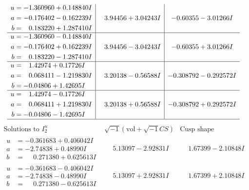 \documentclass[1p]{elsarticle_modified}
\theoremstyle{definition}
\newcommand{\I}{\sqrt{-1}}
\begin{document}
$$\begin{array}{c|c|c}
\begin{aligned}
u &= -1.360960 + 0.148840 I \\
a &= -0.176402 - 0.162239 I \\
b &= \phantom{-}0.183220 + 1.287410 I\end{aligned}
 & \phantom{-}3.94456 + 3.04243 I & -0.60355 - 3.01266 I \\ \hline\begin{aligned}
u &= -1.360960 - 0.148840 I \\
a &= -0.176402 + 0.162239 I \\
b &= \phantom{-}0.183220 - 1.287410 I\end{aligned}
 & \phantom{-}3.94456 - 3.04243 I & -0.60355 + 3.01266 I \\ \hline\begin{aligned}
u &= \phantom{-}1.42974 + 0.17726 I \\
a &= \phantom{-}0.068411 - 1.219830 I \\
b &= -0.04806 + 1.42695 I\end{aligned}
 & \phantom{-}3.20138 - 0.56588 I & -0.308792 - 0.292572 I \\ \hline\begin{aligned}
u &= \phantom{-}1.42974 - 0.17726 I \\
a &= \phantom{-}0.068411 + 1.219830 I \\
b &= -0.04806 - 1.42695 I\end{aligned}
 & \phantom{-}3.20138 + 0.56588 I & -0.308792 + 0.292572 I\\
 \hline 
 \end{array}$$\newpage$$\begin{array}{c|c|c}  
\text{Solutions to }I^u_{2}& \I (\text{vol} + \sqrt{-1}CS) & \text{Cusp shape}\\
 \hline 
\begin{aligned}
u &= -0.361683 + 0.406042 I \\
a &= -2.74838 + 0.48990 I \\
b &= \phantom{-}0.271380 + 0.625613 I\end{aligned}
 & \phantom{-}5.13097 - 2.92831 I & \phantom{-}1.67399 - 2.10848 I \\ \hline\begin{aligned}
u &= -0.361683 - 0.406042 I \\
a &= -2.74838 - 0.48990 I \\
b &= \phantom{-}0.271380 - 0.625613 I\end{aligned}
 & \phantom{-}5.13097 + 2.92831 I & \phantom{-}1.67399 + 2.10848 I \\ \hline\begin{aligned}

\end{aligned}
\end{array}$$
\end{document}
